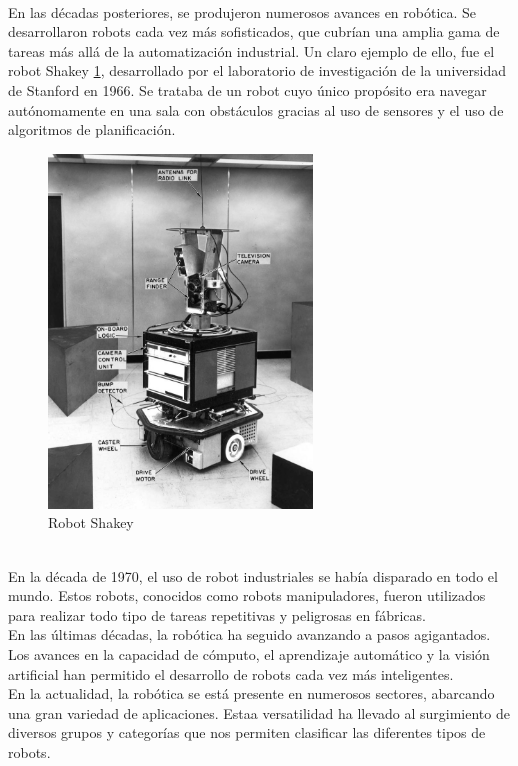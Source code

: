 \\
En las décadas posteriores, se produjeron numerosos avances en robótica. Se desarrollaron robots cada vez más sofisticados, que cubrían una amplia gama de tareas más allá de la 
automatización industrial. Un claro ejemplo de ello, fue el robot Shakey \ref{fig:shakey}, desarrollado por el laboratorio de investigación de la universidad de Stanford en 1966. Se trataba 
de un robot cuyo único propósito era navegar autónomamente en una sala con obstáculos gracias al uso de sensores y el uso de algoritmos de planificación.
\begin{figure} [ht!]
  \begin{center}
    \includegraphics[width=7cm]{figs/shakey.jpg}
  \end{center}
  \caption{Robot Shakey}
  \label{fig:shakey}
\end{figure}\
\\ 
En la década de 1970, el uso de robot industriales se había disparado en todo el mundo. Estos robots, conocidos como robots manipuladores, fueron utilizados para 
realizar todo tipo de tareas repetitivas y peligrosas en fábricas.
\\
En las últimas décadas, la robótica ha seguido avanzando a pasos agigantados. Los avances en la capacidad de cómputo, el aprendizaje automático y la visión 
artificial han permitido el desarrollo de robots cada vez más inteligentes.
\\
En la actualidad, la robótica se está presente en numerosos sectores, abarcando una gran variedad de aplicaciones. Estaa versatilidad ha llevado al surgimiento 
de diversos grupos y categorías que nos permiten clasificar las diferentes tipos de robots. 
\newpage


